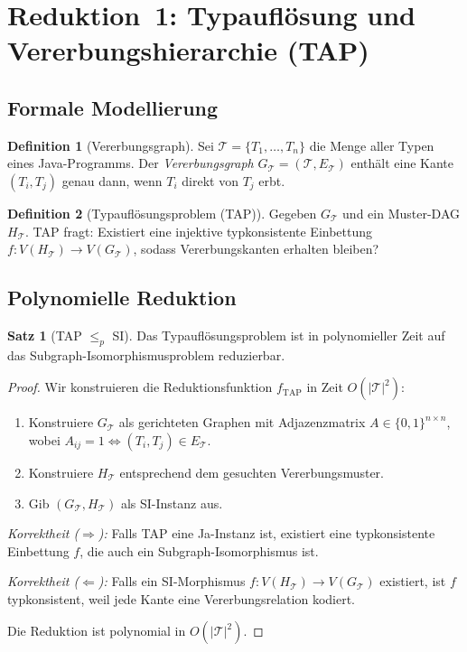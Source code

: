 ﻿\documentclass[a4paper,12pt]{article}
\theoremstyle{definition}
\newtheorem{definition}{Definition}
\newtheorem{satz}{Satz}
\begin{document}
\section{Reduktion~1: Typaufl\"osung und Vererbungshierarchie (TAP)}
\label{sec:tap}

\subsection{Formale Modellierung}

\begin{definition}[Vererbungsgraph]
Sei $\mathcal{T} = \{T_1, \ldots, T_n\}$ die Menge aller Typen eines
Java-Programms.  Der \emph{Vererbungsgraph}
$G_{\mathcal{T}} = (\mathcal{T}, E_{\mathcal{T}})$ enth\"alt eine
Kante $(T_i, T_j)$ genau dann, wenn $T_i$ direkt von $T_j$ erbt.
\end{definition}

\begin{definition}[Typaufl\"osungsproblem (TAP)]
Gegeben $G_{\mathcal{T}}$ und ein Muster-DAG $H_{\mathcal{T}}$.
\textsc{TAP} fragt: Existiert eine injektive typkonsistente Einbettung
$f\colon V(H_{\mathcal{T}}) \to V(G_{\mathcal{T}})$, sodass
Vererbungskanten erhalten bleiben?
\end{definition}

\subsection{Polynomielle Reduktion}

\begin{satz}[TAP $\leq_p$ SI]
\label{satz:tap}
Das Typaufl\"osungsproblem ist in polynomieller Zeit auf das
Subgraph-Isomorphismusproblem reduzierbar.
\end{satz}

\begin{proof}
Wir konstruieren die Reduktionsfunktion $f_{\mathrm{TAP}}$ in Zeit
$O(|\mathcal{T}|^2)$:
\begin{enumerate}
    \item Konstruiere $G_{\mathcal{T}}$ als gerichteten Graphen mit
          Adjazenzmatrix $A \in \{0,1\}^{n \times n}$, wobei
          $A_{ij} = 1 \Leftrightarrow (T_i, T_j) \in E_{\mathcal{T}}$.
    \item Konstruiere $H_{\mathcal{T}}$ entsprechend dem gesuchten
          Vererbungsmuster.
    \item Gib $(G_{\mathcal{T}}, H_{\mathcal{T}})$ als SI-Instanz aus.
\end{enumerate}

\emph{Korrektheit ($\Rightarrow$):} Falls \textsc{TAP} eine
Ja-Instanz ist, existiert eine typkonsistente Einbettung $f$, die
auch ein Subgraph-Isomorphismus ist.

\emph{Korrektheit ($\Leftarrow$):} Falls ein SI-Morphismus
$f\colon V(H_{\mathcal{T}}) \to V(G_{\mathcal{T}})$ existiert, ist $f$
typkonsistent, weil jede Kante eine Vererbungsrelation kodiert.

Die Reduktion ist polynomial in $O(|\mathcal{T}|^2)$.
\end{proof}
\end{document}
